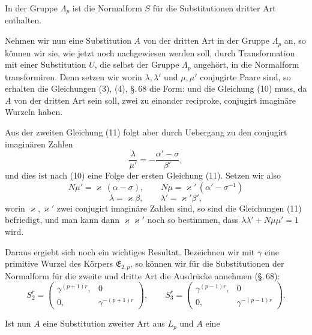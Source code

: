 In der Gruppe $\Lambda_p$ ist die Normalform $S$ für die Substitutionen
 dritter Art enthalten.

Nehmen wir nun eine Substitution $A$ von der dritten Art in
der Gruppe $\Lambda_p$ an, so können wir sie, wie jetzt noch nachgewiesen
 werden soll, durch Transformation mit einer Substitution
 $U$, die selbst der Gruppe $\Lambda_p$ angehört, in die Normalform
 transformiren. Denn setzen wir
worin $\lambda,\lambda'$ und $\mu,\mu'$ conjugirte Paare sind, so erhalten die
Gleichungen (3), (4), §.\,68 die Form:
und die Gleichung (10) muss, da $A$ von der dritten Art sein
soll, zwei zu einander reciproke, conjugirt imaginäre Wurzeln
haben.

Aus der zweiten Gleichung (11) folgt aber durch Uebergang
zu den conjugirt imaginären Zahlen
\[
\dfrac{\lambda}{\mu'} = -\dfrac{\alpha'-\sigma}{\beta'},
\]
und dies ist nach (10) eine Folge der ersten Gleichung (11).
Setzen wir also
\[
N\mu' = \varkappa\,(\alpha-\sigma), \qquad N\mu = \varkappa'\,(\alpha'-\sigma^{-1})
\]
\[
\lambda = \varkappa\beta, \qquad \lambda' = \varkappa'\beta',
\]
worin $\varkappa,\varkappa'$ zwei conjugirt imaginäre Zahlen sind, so sind die
Gleichungen (11) befriedigt, und man kann dann $\varkappa\varkappa'$ noch so
bestimmen, dass $\lambda\lambda'+N\mu\mu' = 1$ wird.

Daraus ergiebt sich noch ein wichtiges Resultat. Bezeichnen
wir mit $\gamma$ eine primitive Wurzel des Körpers $\mathfrak{E}_{2,p}$, so können
wir für die Substitutionen der Normalform für die zweite und
dritte Art die Ausdrücke annehmen (§.\,68):
\[
S_2^r = \begin{pmatrix} \gamma^{(p+1)r}, & 0 \\ 0, & \gamma^{-(p+1)r} \end{pmatrix}, \qquad S_3^r = \begin{pmatrix} \gamma^{(p-1)r}, & 0 \\ 0, & \gamma^{-(p-1)r} \end{pmatrix}.
\]

Ist nun $A$ eine Substitution zweiter Art aus $L_p$ und $A$ eine
